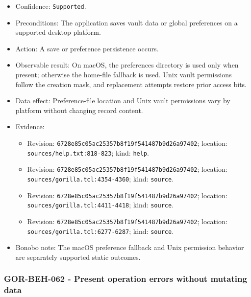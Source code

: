 \documentclass[
  letterpaper,
]{article}
\newcommand{\passthrough}[1]{#1}
\providecommand{\tightlist}{%
  \setlength{\itemsep}{0pt}\setlength{\parskip}{0pt}}
\begin{document}
\begin{itemize}
\tightlist
\item
  Confidence: \passthrough{\lstinline!Supported!}.
\item
  Preconditions: The application saves vault data or global preferences on a supported desktop platform.
\item
  Action: A save or preference persistence occurs.
\item
  Observable result: On macOS, the preferences directory is used only when present; otherwise the home-file fallback is
  used. Unix vault permissions follow the creation mask, and replacement attempts restore prior access bits.
\item
  Data effect: Preference-file location and Unix vault permissions vary by platform without changing record content.
\item
  Evidence:

  \begin{itemize}
  \tightlist
  \item
    Revision: \nolinkurl{6728e85c05ac25357b8f19f541487b9d26a97402}; location: \nolinkurl{sources/help.txt:818-823};
    kind: \passthrough{\lstinline!help!}.
  \item
    Revision: \nolinkurl{6728e85c05ac25357b8f19f541487b9d26a97402}; location: \nolinkurl{sources/gorilla.tcl:4354-4360};
    kind: \passthrough{\lstinline!source!}.
  \item
    Revision: \nolinkurl{6728e85c05ac25357b8f19f541487b9d26a97402}; location: \nolinkurl{sources/gorilla.tcl:4411-4418};
    kind: \passthrough{\lstinline!source!}.
  \item
    Revision: \nolinkurl{6728e85c05ac25357b8f19f541487b9d26a97402}; location: \nolinkurl{sources/gorilla.tcl:6277-6287};
    kind: \passthrough{\lstinline!source!}.
  \end{itemize}
\item
  Bonobo note: The macOS preference fallback and Unix permission behavior are separately supported static outcomes.
\end{itemize}

\subsubsection{GOR-BEH-062 - Present operation errors without mutating
data}\label{gor-beh-062---present-operation-errors-without-mutating-data}
\end{document}
